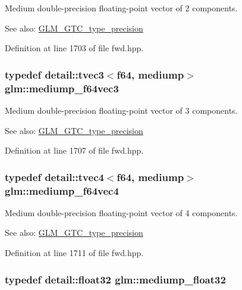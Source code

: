 Medium double-precision floating-point vector of 2 components. \begin{Desc}
\item[See also:]\hyperlink{group__gtc__type__precision}{GLM\_\-GTC\_\-type\_\-precision} \end{Desc}


Definition at line 1703 of file fwd.hpp.\hypertarget{group__gtc__type__precision_ge2832f9acbf0cc1071fcf93336db6e0c}{
\subsubsection[mediump\_\-f64vec3]{\setlength{\rightskip}{0pt plus 5cm}typedef detail::tvec3$<$f64, mediump$>$ {\bf glm::mediump\_\-f64vec3}}}
\label{group__gtc__type__precision_ge2832f9acbf0cc1071fcf93336db6e0c}


Medium double-precision floating-point vector of 3 components. \begin{Desc}
\item[See also:]\hyperlink{group__gtc__type__precision}{GLM\_\-GTC\_\-type\_\-precision} \end{Desc}


Definition at line 1707 of file fwd.hpp.\hypertarget{group__gtc__type__precision_g0e011facac062fd7fb9b40c7d8288310}{
\subsubsection[mediump\_\-f64vec4]{\setlength{\rightskip}{0pt plus 5cm}typedef detail::tvec4$<$f64, mediump$>$ {\bf glm::mediump\_\-f64vec4}}}
\label{group__gtc__type__precision_g0e011facac062fd7fb9b40c7d8288310}


Medium double-precision floating-point vector of 4 components. \begin{Desc}
\item[See also:]\hyperlink{group__gtc__type__precision}{GLM\_\-GTC\_\-type\_\-precision} \end{Desc}


Definition at line 1711 of file fwd.hpp.\hypertarget{group__gtc__type__precision_g1b5f74cbeed0c9d42cd57d77609be7ee}{
\subsubsection[mediump\_\-float32]{\setlength{\rightskip}{0pt plus 5cm}typedef detail::float32 {\bf glm::mediump\_\-float32}}}
\label{group__gtc__type__precision_g1b5f74cbeed0c9d42cd57d77609be7ee}


